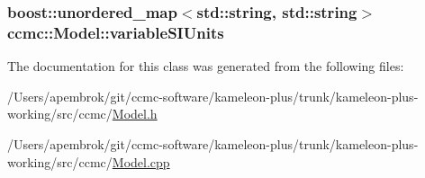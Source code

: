 \hypertarget{classccmc_1_1_model_af782a4c86004df7b9388562551ae87ad}{
\subsubsection[{variable\-S\-I\-Units}]{\setlength{\rightskip}{0pt plus 5cm}boost\-::unordered\-\_\-map$<$std\-::string, std\-::string$>$ ccmc\-::\-Model\-::variable\-S\-I\-Units\hspace{0.3cm}{\ttfamily [protected]}}}\label{classccmc_1_1_model_af782a4c86004df7b9388562551ae87ad}


The documentation for this class was generated from the following files\-:\begin{DoxyCompactItemize}
\item 
/\-Users/apembrok/git/ccmc-\/software/kameleon-\/plus/trunk/kameleon-\/plus-\/working/src/ccmc/\hyperlink{_model_8h}{Model.\-h}\item 
/\-Users/apembrok/git/ccmc-\/software/kameleon-\/plus/trunk/kameleon-\/plus-\/working/src/ccmc/\hyperlink{_model_8cpp}{Model.\-cpp}\end{DoxyCompactItemize}
